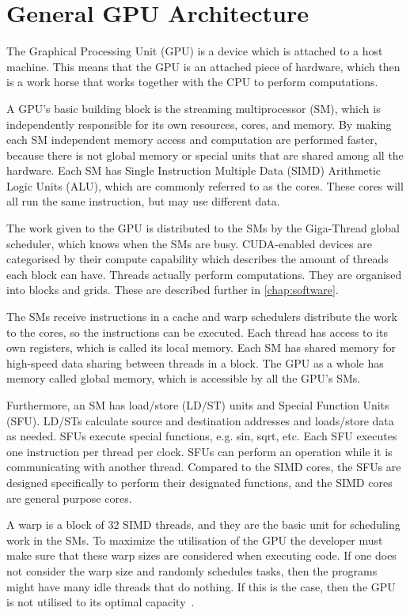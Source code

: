 \section{General GPU Architecture}
\label{sec:gpu}

The Graphical Processing Unit (GPU) is a device which is attached to a host machine.
This means that the GPU is an attached piece of hardware, which then is a work horse that works together with the CPU to perform computations.

A GPU's basic building block is the streaming multiprocessor (SM), which is independently responsible for its own resources, cores, and memory.
By making each SM independent memory access and computation are performed faster, because there is not global memory or special units that are shared among all the hardware.
Each SM has Single Instruction Multiple Data (SIMD) Arithmetic Logic Units (ALU), which are commonly referred to as the cores.
These cores will all run the same instruction, but may use different data.

The work given to the GPU is distributed to the SMs by the Giga-Thread global scheduler, which knows when the SMs are busy.
CUDA-enabled devices are categorised by their compute capability which describes the amount of threads each block can have.
Threads actually perform computations.
They are organised into blocks and grids.
These are described further in \cref{chap:software}.

The SMs receive instructions in a cache and warp schedulers distribute the work to the cores, so the instructions can be executed.
Each thread has access to its own registers, which is called its local memory.
Each SM has shared memory for high-speed data sharing between threads in a block.
The GPU as a whole has memory called global memory, which is accessible by all the GPU's SMs.

Furthermore, an SM has load/store (LD/ST) units and Special Function Units (SFU).
LD/STs calculate source and destination addresses and loads/store data as needed.
SFUs execute special functions, e.g. sin, sqrt, etc.
Each SFU executes one instruction per thread per clock.
SFUs can perform an operation while it is communicating with another thread.
Compared to the SIMD cores, the SFUs are designed specifically to perform their designated functions, and the SIMD cores are general purpose cores.

A warp is a block of 32 SIMD threads, and they are the basic unit for scheduling work in the SMs.
To maximize the utilisation of the GPU the developer must make sure that these warp sizes are considered when executing code.
If one does not consider the warp size and randomly schedules tasks, then the programs might have many idle threads that do nothing.
If this is the case, then the GPU is not utilised to its optimal capacity~\cite{fermi2009nvidia}.

